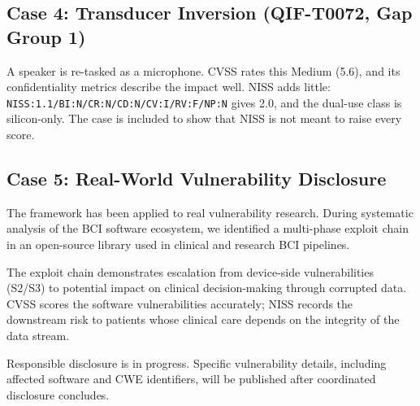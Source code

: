 \subsection{Case 4: Transducer Inversion (QIF-T0072, Gap Group 1)}

A speaker is re-tasked as a microphone. CVSS rates this Medium (5.6), and its
confidentiality metrics describe the impact well. NISS adds little:
\texttt{NISS:1.1/BI:N/CR:N/CD:N/CV:I/RV:F/NP:N} gives 2.0, and the dual-use class is
silicon-only. The case is included to show that NISS is not meant to raise every score.

\subsection{Case 5: Real-World Vulnerability Disclosure}

The \qif framework has been applied to real vulnerability research. During
systematic analysis of the BCI software ecosystem, we identified a multi-phase
exploit chain in an open-source library used in clinical and research BCI
pipelines.

The exploit chain demonstrates escalation from device-side vulnerabilities
(S2/S3) to potential impact on clinical decision-making through corrupted data.
CVSS scores the software vulnerabilities accurately; NISS records the downstream
risk to patients whose clinical care depends on the integrity of the data stream.

Responsible disclosure is in progress. Specific vulnerability details, including
affected software and CWE identifiers, will be published after coordinated
disclosure concludes.
